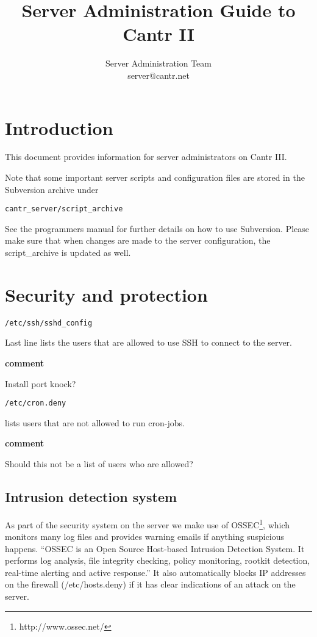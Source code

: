 \documentclass[a4paper,12pt]{article}
\newcommand{\comment}[1]{\begin{center}\colorbox{commentcol}{\begin{minipage}{\textwidth}\begin{center}{\bf comment}\end{center}#1\end{minipage}}\end{center}}
\begin{document}
\title{Server Administration Guide to Cantr II}
\author{Server Administration Team\\server@cantr.net}
\maketitle

\tableofcontents

\section{Introduction}

This document provides information for server administrators on Cantr III.

Note that some important server scripts and configuration files are stored in the Subversion archive under 
\begin{verbatim}
cantr_server/script_archive
\end{verbatim}
See the programmers manual for further details on how to use Subversion. Please make sure that when changes are made to the server configuration, the script\_archive is updated as well.

\section{Security and protection}

\begin{verbatim}
/etc/ssh/sshd_config
\end{verbatim}
Last line lists the users that are allowed to use SSH to connect to the server.
\comment{Install port knock?}

\begin{verbatim}
/etc/cron.deny
\end{verbatim}
lists users that are not allowed to run cron-jobs.
\comment{Should this not be a list of users who are allowed?}

\subsection{Intrusion detection system}

As part of the security system on the server we make use of OSSEC\footnote{http://www.ossec.net/}, which monitors many log files and provides warning emails if anything suspicious happens. ``OSSEC is an Open Source Host-based Intrusion Detection System. It
performs log analysis, file integrity checking, policy monitoring,
rootkit detection, real-time alerting and active response.'' It also automatically blocks IP addresses on the firewall (/etc/hosts.deny) if it has clear indications of an attack on the server.
\end{document}
